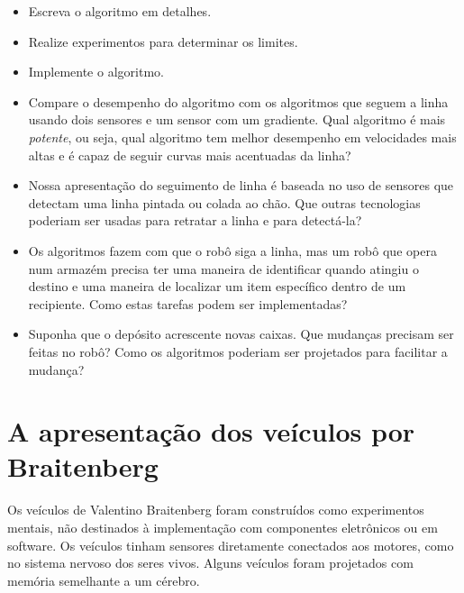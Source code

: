 \begin{framed}
\begin{itemize}
\item Escreva o algoritmo em detalhes.
\item Realize experimentos para determinar os limites.
\item Implemente o algoritmo.
\item Compare o desempenho do algoritmo com os algoritmos que seguem a linha usando dois sensores e um sensor com um gradiente. Qual algoritmo é mais \emph{potente}, ou seja, qual algoritmo tem melhor desempenho em velocidades mais altas e é capaz de seguir curvas mais acentuadas da linha?
\end{itemize}
\end{framed}

\begin{framed}
\begin{itemize}
\item Nossa apresentação do seguimento de linha é baseada no uso de sensores que detectam uma linha pintada ou colada ao chão. Que outras tecnologias poderiam ser usadas para retratar a linha e para detectá-la?
\item Os algoritmos fazem com que o robô siga a linha, mas um robô que opera num armazém precisa ter uma maneira de identificar quando atingiu o destino e uma maneira de localizar um item específico dentro de um recipiente. Como estas tarefas podem ser implementadas?
\item Suponha que o depósito acrescente novas caixas. Que mudanças precisam ser feitas no robô? Como os algoritmos poderiam ser projetados para facilitar a mudança?
\end{itemize}
\end{framed}

\section{A apresentação dos veículos por Braitenberg}\label{s.abstract-vehicles}

Os veículos de Valentino Braitenberg foram construídos como experimentos mentais, não destinados à implementação com componentes eletrônicos ou em software. Os veículos tinham sensores diretamente conectados aos motores, como no sistema nervoso dos seres vivos. Alguns veículos foram projetados com memória semelhante a um cérebro.

